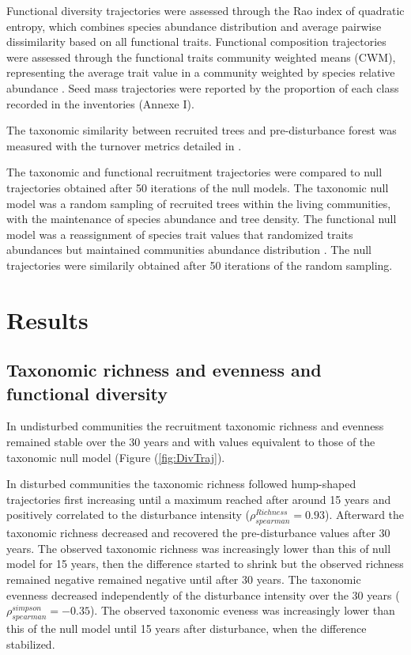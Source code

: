 \documentclass[fleqn,10pt]{ArtEcoFoG} %
\begin{document}
Functional diversity trajectories were assessed through the Rao index of
quadratic entropy, which combines species abundance distribution and
average pairwise dissimilarity based on all functional traits.
Functional composition trajectories were assessed through the functional
traits community weighted means (CWM), representing the average trait
value in a community weighted by species relative abundance
\citep{Diaz2007}. Seed mass trajectories were reported by the proportion
of each class recorded in the inventories (Annexe I).

The taxonomic similarity between recruited trees and pre-disturbance
forest was measured with the turnover metrics detailed in
\citet{Podani2013a}.

The taxonomic and functional recruitment trajectories were compared to
null trajectories obtained after 50 iterations of the null models. The
taxonomic null model was a random sampling of recruited trees within the
living communities, with the maintenance of species abundance and tree
density. The functional null model was a reassignment of species trait
values that randomized traits abundances but maintained communities
abundance distribution \citep{Mason2013}. The null trajectories were
similarily obtained after 50 iterations of the random sampling.

\section{Results}\label{results}

\subsection{Taxonomic richness and evenness and functional
diversity}\label{taxonomic-richness-and-evenness-and-functional-diversity}

In undisturbed communities the recruitment taxonomic richness and
evenness remained stable over the 30 years and with values equivalent to
those of the taxonomic null model (Figure (\ref{fig:DivTraj}).

In disturbed communities the taxonomic richness followed hump-shaped
trajectories first increasing until a maximum reached after around 15
years and positively correlated to the disturbance intensity
(\(\rho^{Richness}_{spearman}=0.93\)). Afterward the taxonomic richness
decreased and recovered the pre-disturbance values after 30 years. The
observed taxonomic richness was increasingly lower than this of null
model for 15 years, then the difference started to shrink but the
observed richness remained negative remained negative until after 30
years. The taxonomic evenness decreased independently of the disturbance
intensity over the 30 years (\(\rho^{simpson}_{spearman}=-0.35\)). The
observed taxonomic eveness was increasingly lower than this of the null
model until 15 years after disturbance, when the difference stabilized.
\end{document}
